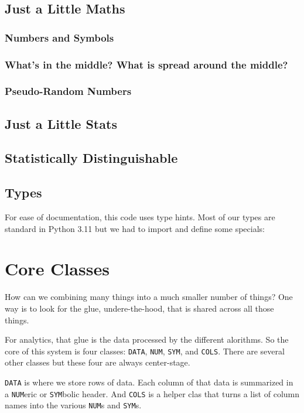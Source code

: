 \documentclass[landscape,	DIV=calc,%
							paper=letter,%
							fontsize=10pt,%
							twocolumn]{scrartcl}	 					%
\newcommand{\VERSION}{3.11}
\begin{document}
\subsection{Just a Little Maths}
\subsubsection{Numbers and Symbols}
\subsubsection{What's in the middle? What is spread around the middle?}

\subsubsection{Pseudo-Random Numbers}

\subsection{Just a Little Stats}
\subsection{Statistically Distinguishable}
\subsection{Types}
For ease of documentation, this code uses type hints.  Most of our types are standard in Python {\VERSION}
but we had to import and define some specials:



\section{Core Classes}
How can we  combining many things into a much smaller number of things? One way is to look for
the glue, undere-the-hood, that is shared across all those things.

For analytics, that glue is the data processed by the different alorithms. So the core
of this system is 
four classes: 
\verb+DATA+, 
\verb+NUM+, 
\verb+SYM+, 
and \verb+COLS+. There are several other classes but these four are always center-stage.

\verb+DATA+ is where we store rows of data. Each column of that data is summarized
in a \verb+NUM+eric or \verb+SYM+bolic header. And \verb+COLS+ is a helper clas
that turns a list of column names into the various \verb+NUM+s and \verb+SYM+s.
\end{document}
